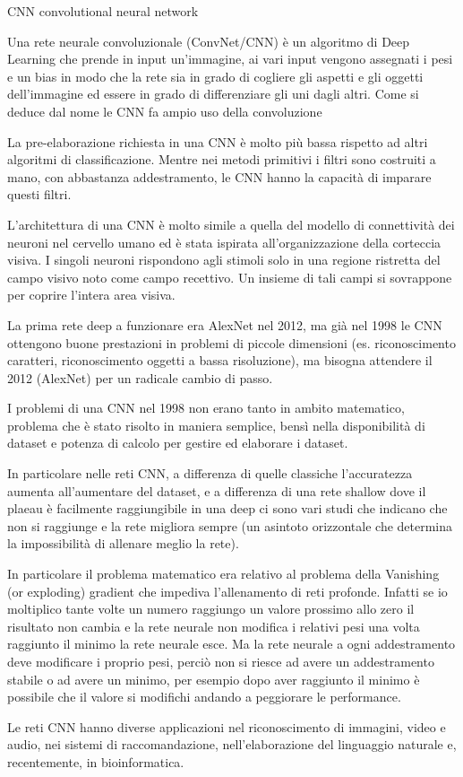 \makeglossaries

 {CNN} {convolutional neural network}
{
    Una rete neurale convoluzionale (ConvNet/CNN) è un algoritmo di Deep Learning che prende in input un'immagine, ai vari input vengono assegnati i pesi e un bias in modo che la rete sia in grado di cogliere gli aspetti e gli oggetti dell'immagine ed essere in grado di differenziare gli uni dagli altri. Come si deduce dal nome le CNN fa ampio uso della \gls{convoluzione}

    La pre-elaborazione richiesta in una CNN è molto più bassa rispetto ad altri algoritmi di classificazione. Mentre nei metodi primitivi i filtri sono costruiti a mano, con abbastanza addestramento, le CNN hanno la capacità di imparare questi filtri.

    L'architettura di una CNN è molto simile a quella del modello di connettività dei neuroni nel cervello umano ed è stata ispirata all'organizzazione della corteccia visiva. I singoli neuroni rispondono agli stimoli solo in una regione ristretta del campo visivo noto come campo recettivo. Un insieme di tali campi si sovrappone per coprire l'intera area visiva.

    La prima rete deep a funzionare era AlexNet nel 2012, ma già nel 1998 le CNN ottengono buone prestazioni in problemi di
    piccole dimensioni (es. riconoscimento caratteri, riconoscimento
    oggetti a bassa risoluzione), ma bisogna attendere il 2012
    (AlexNet) per un radicale cambio di passo.

    I problemi di una CNN nel 1998 non erano tanto in ambito matematico, problema che è stato risolto in maniera semplice, bensì nella disponibilità di dataset e potenza di calcolo per gestire ed elaborare i dataset.

    In particolare nelle reti CNN, a differenza di quelle classiche l'accuratezza aumenta all'aumentare del dataset, e a differenza di una rete shallow dove il  plaeau è facilmente raggiungibile in una deep ci sono vari studi che indicano che non si raggiunge e la rete migliora sempre    (un asintoto orizzontale che determina la impossibilità di allenare meglio la rete).

    In particolare il problema matematico era relativo al problema della Vanishing (or exploding) gradient che impediva l'allenamento di reti profonde. Infatti se io moltiplico tante volte un numero raggiungo un valore prossimo allo zero il risultato non cambia e la rete neurale non modifica i relativi pesi una volta raggiunto il minimo la rete neurale esce. Ma la rete neurale a ogni addestramento deve modificare i proprio pesi,  perciò non si riesce ad avere un addestramento stabile o ad avere un minimo, per esempio dopo aver raggiunto il minimo  è possibile che il valore si modifichi andando a peggiorare le performance.

    Le reti CNN hanno diverse applicazioni nel riconoscimento di immagini,  video e audio, nei sistemi di raccomandazione, nell’elaborazione del
    linguaggio naturale e, recentemente, in bioinformatica.
}

